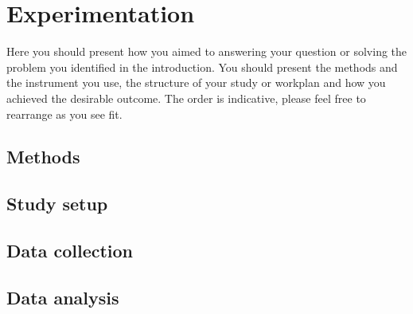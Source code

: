 \chapter{Experimentation}
\label{sec:Experimentation}

Here you should present how you aimed to answering your question or solving the problem you identified in the introduction.
You should present the methods and the instrument you use, the structure of your study or workplan and how you achieved the desirable outcome. The order is indicative, please feel free to rearrange as you see fit.

\section {Methods}

\section{Study setup}

\section{Data collection}


\section{Data analysis}

